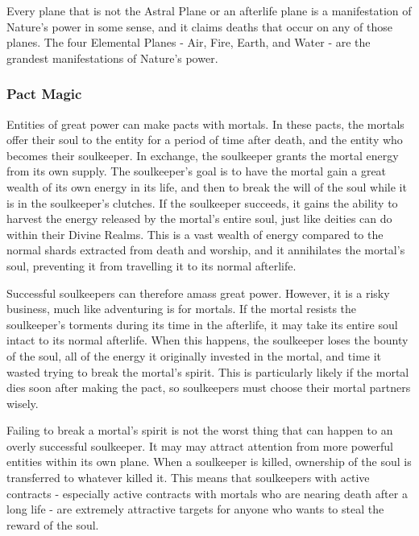      Every plane that is not the Astral Plane or an afterlife plane is a manifestation of Nature's power in some sense, and it claims deaths that occur on any of those planes.
      The four Elemental Planes - Air, Fire, Earth, and Water - are the grandest manifestations of Nature's power.

    \subsubsection{Pact Magic}
      Entities of great power can make pacts with mortals.
      In these pacts, the mortals offer their soul to the entity for a period of time after death, and the entity who becomes their soulkeeper.
      In exchange, the soulkeeper grants the mortal energy from its own supply.
      The soulkeeper's goal is to have the mortal gain a great wealth of its own energy in its life, and then to break the will of the soul while it is in the soulkeeper's clutches.
      If the soulkeeper succeeds, it gains the ability to harvest the energy released by the mortal's entire soul, just like deities can do within their Divine Realms.
      This is a vast wealth of energy compared to the normal shards extracted from death and worship, and it annihilates the mortal's soul, preventing it from travelling it to its normal afterlife.

      Successful soulkeepers can therefore amass great power.
      However, it is a risky business, much like adventuring is for mortals.
      If the mortal resists the soulkeeper's torments during its time in the afterlife, it may take its entire soul intact to its normal afterlife.
      When this happens, the soulkeeper loses the bounty of the soul, all of the energy it originally invested in the mortal, and time it wasted trying to break the mortal's spirit.
      This is particularly likely if the mortal dies soon after making the pact, so soulkeepers must choose their mortal partners wisely.

      Failing to break a mortal's spirit is not the worst thing that can happen to an overly successful soulkeeper.
      It may may attract attention from more powerful entities within its own plane.
      When a soulkeeper is killed, ownership of the soul is transferred to whatever killed it.
      This means that soulkeepers with active contracts - especially active contracts with mortals who are nearing death after a long life - are extremely attractive targets for anyone who wants to steal the reward of the soul.

